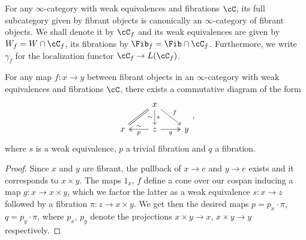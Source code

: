 \begin{construction}
  For any $\infty$-category with weak equivalences and fibrations $\cC$, its
  full subcategory given by fibrant objects is canonically an $\infty$-category
  of fibrant objects. We shall denote it by $\cC_f$ and its weak equivalences
  are given by $W_f=W\cap\cC_f$, its fibrations by $\Fib_f=\Fib\cap\cC_f$.
  Furthermore, we write $\gamma_f$ for the localization functor
  $\cC_f\rightarrow L(\cC_f)$.
\end{construction}

\begin{lem}\label{7413}

  For any map $f\colon x\rightarrow y$ between fibrant objects in an
  $\infty$-category with weak equivalences and fibrations $\cC$, there exists a
  commutative diagram of the form
  \[\begin{tikzcd}
    & x \\
    x & z & y
    \arrow[Rightarrow, no head, from=1-2, to=2-1]
    \arrow["s", "{\sim}"', from=1-2, to=2-2]
    \arrow["p", "\sim"', two heads, from=2-2, to=2-1]
    \arrow["q"', two heads, from=2-2, to=2-3]
    \arrow["f", from=1-2, to=2-3]
  \end{tikzcd},\]
  where $s$ is a weak equivalence, $p$ a trivial fibration and $q$ a fibration.
\end{lem}
\begin{proof}
  Since $x$ and $y$ are fibrant, the pullback of $x\rightarrow e$ and
  $y\rightarrow e$ exists and it corresponds to $x\times y$. The maps $1_x$,
  $f$ define a cone over our cospan inducing a map $g\colon x\rightarrow
  x\times y$, which we
  factor the latter as a weak equivalence $s\colon x\rightarrow z$ followed by a
  fibration $\pi\colon z\rightarrow x\times y$. We get then the desired maps
  $p=p_x\cdot\pi$, $q=p_y\cdot\pi$, where $p_x$, $p_y$ denote the projections
  $x\times y\rightarrow x$, $x\times y\rightarrow y$ respectively.
\end{proof}


